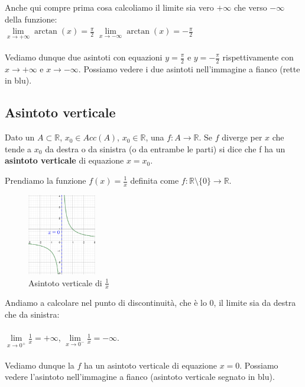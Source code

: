 Anche qui compre prima cosa calcoliamo il limite sia vero $+\infty$ che verso $-\infty$ della funzione:\\ $\lim\limits_{x \to +\infty}\arctan(x) = \frac{\pi}{2}$
$\lim\limits_{x \to -\infty}\arctan(x) = -\frac{\pi}{2}$\\\\
Vediamo dunque due asintoti con equazioni $y=\frac{\pi}{2}$ e $y=-\frac{\pi}{2}$ rispettivamente con $x\to +\infty$ e $x\to -\infty$.
Possiamo vedere i due asintoti nell'immagine a fianco (rette in blu).\\

\subsection{Asintoto verticale}
\begin{definition}
Dato un $A \subset \mathbb{R}$, $x_0\in Acc(A)$, $x_0 \in \mathbb{R}$, una $f:A\to \mathbb{R}$. Se $f$ diverge per $x$ che tende a $x_0$ da destra o da sinistra (o da entrambe le parti) si dice che f ha un \textbf{asintoto verticale} di equazione $x=x_0$.
\end{definition}

\begin{example}
Prendiamo la funzione $f(x) = \frac{1}{x}$ definita come $f: \mathbb{R} \setminus \{0\} \to \mathbb{R}$.
\end{example}
\begin{figure}
    \vspace{-10pt}
    \centering
    \includegraphics[width=3cm]{images/asintoto-verticale-1.png}
    \caption{Asintoto verticale di $\frac{1}{x}$}
\end{figure}

Andiamo a calcolare nel punto di discontinuità, che è lo 0, il limite sia da destra che da sinistra:\\\\
$\lim\limits_{x\to 0^+}\frac{1}{x} = +\infty$, $\lim\limits_{x\to 0^-}\frac{1}{x} = -\infty$.\\\\
Vediamo dunque la $f$ ha un asintoto verticale di equazione $x=0$. Possiamo vedere l'asintoto nell'immagine a fianco (asintoto verticale segnato in blu).\\

